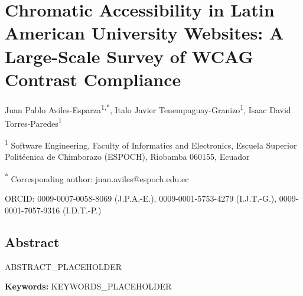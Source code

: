 \section*{Chromatic Accessibility in Latin American University Websites: A Large-Scale Survey of WCAG Contrast Compliance}

Juan Pablo Aviles-Esparza\textsuperscript{1,*}, Italo Javier Tenempaguay-Granizo\textsuperscript{1}, Isaac David Torres-Paredes\textsuperscript{1}

\textsuperscript{1} Software Engineering, Faculty of Informatics and Electronics, Escuela Superior Politécnica de Chimborazo (ESPOCH), Riobamba 060155, Ecuador

\textsuperscript{*} Corresponding author: juan.aviles@espoch.edu.ec

ORCID: 0009-0007-0058-8069 (J.P.A.-E.), 0009-0001-5753-4279 (I.J.T.-G.), 0009-0001-7057-9316 (I.D.T.-P.)

\subsection*{Abstract}

ABSTRACT_PLACEHOLDER

\textbf{Keywords:} KEYWORDS_PLACEHOLDER

